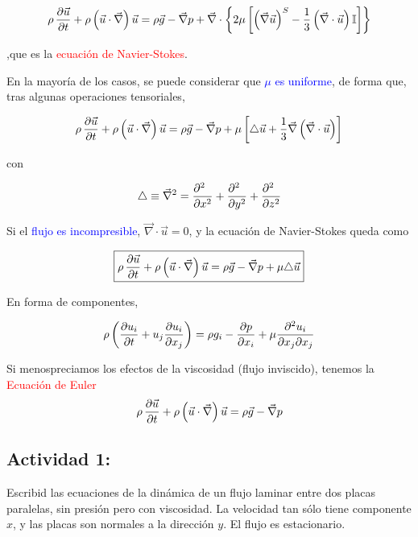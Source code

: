 	\begin{equation}
		\rho\,\frac{\partial \vec{u}}{\partial t}+\rho\left(\vec{u}\cdot\vec{\nabla}\right)\vec{u}=\rho\vec{g}-\vec{\nabla}p+\vec{\nabla}\cdot\left\{ 2\mu\left[\left(\vec{\nabla}\vec{u}\right)^{S}-\frac{1}{3}\left(\vec{\nabla}\cdot\vec{u}\right)\mathbb{I}\right]\right\}
	\end{equation}
	
	,que es la \textcolor{red}{ecuación de Navier-Stokes}.

	
	En la mayoría de los casos, se puede considerar que \textcolor{blue}{$\mu$
		es uniforme}, de forma que, tras algunas operaciones tensoriales,
	
	\begin{equation}
		\rho\,\frac{\partial \vec{u}}{\partial t}+\rho\left(\vec{u}\cdot\vec{\nabla}\right)\vec{u}=\rho\vec{g}-\vec{\nabla}p+\mu\left[\triangle\vec{u}+\frac{1}{3}\vec{\nabla}\left(\vec{\nabla}\cdot\vec{u}\right)\right]
	\end{equation}
	
	con 
	
	\begin{equation}
		\triangle\equiv{\vec{\nabla}}^{2}=\frac{\partial^2 \phantom{x}}{\partial x^2}+\frac{\partial^2 \phantom{y}}{\partial y^2}+\frac{\partial^2 \phantom{z}}{\partial z^2}
	\end{equation}
	
	
	Si el \textcolor{blue}{flujo es incompresible}, $\vec{\nabla}\cdot\vec{u}=0$,
	y la ecuación de Navier-Stokes queda como 
	
\begin{equation}
		\boxed{\rho\,\frac{\partial \vec{u}}{\partial t}+\rho\left(\vec{u}\cdot\vec{\nabla}\right)\vec{u}=\rho\vec{g}-\vec{\nabla}p+\mu\triangle\vec{u}}
\end{equation}
	
	
	En forma de componentes, 
	
	\begin{equation}
		\rho\left(\frac{\partial u_{i}}{\partial t}+u_{j}\frac{\partial u_{i}}{\partial x_{j}}\right)=\rho g_{i}-\frac{\partial p}{\partial x_{i}}+\mu\frac{\partial^{2}u_{i}}{\partial x_{j}\partial x_{j}}
	\end{equation}
	

	

		Si menospreciamos los efectos de la viscosidad (flujo inviscido),
		tenemos la \textcolor{red}{Ecuación de Euler} 
		\[
		\rho\,\frac{\partial \vec{u}}{\partial t}+\rho\left(\vec{u}\cdot\vec{\nabla}\right)\vec{u}=\rho\vec{g}-\vec{\nabla}p
		\]

	\subsection*{Actividad 1:}
		Escribid las ecuaciones de la dinámica de un flujo laminar entre
		dos placas paralelas, sin presión pero con viscosidad. La velocidad
		tan sólo tiene componente $x$, y las placas son normales a la dirección
		$y$. El flujo es estacionario. 
		
